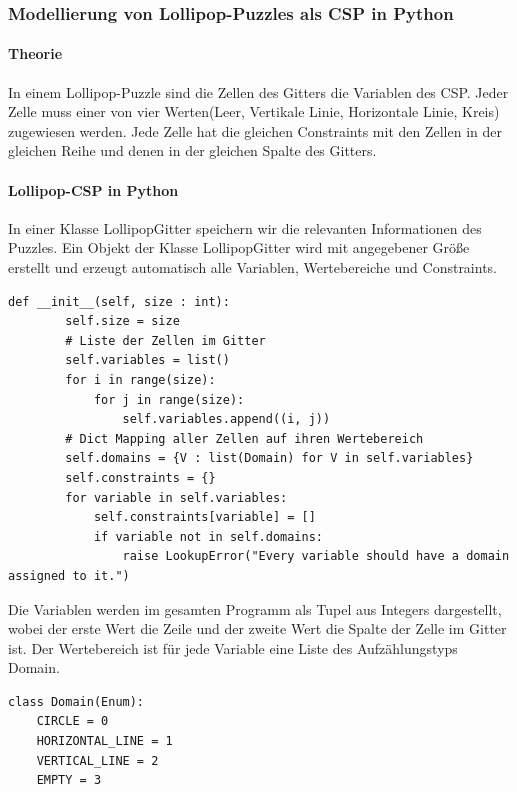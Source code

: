 \documentclass{article}
\begin{document}
\subsubsection{Modellierung von Lollipop-Puzzles als CSP in Python}

\paragraph{Theorie}

In einem Lollipop-Puzzle sind die Zellen des Gitters die Variablen des CSP.
Jeder Zelle muss einer von vier Werten(Leer, Vertikale Linie, Horizontale Linie, Kreis) zugewiesen werden.
Jede Zelle hat die gleichen Constraints mit den Zellen in der gleichen Reihe und denen in der gleichen Spalte des Gitters.

\paragraph{Lollipop-CSP in Python}

In einer Klasse \glqq LollipopGitter\grqq{} speichern wir die relevanten Informationen des Puzzles.
Ein Objekt der Klasse LollipopGitter wird mit angegebener Größe erstellt und erzeugt automatisch alle Variablen, Wertebereiche und Constraints.
\begin{lstlisting}[label={lst:LollipopKonstruktor}]
     def __init__(self, size : int):
        self.size = size
        # Liste der Zellen im Gitter
        self.variables = list()
        for i in range(size):
            for j in range(size):
                self.variables.append((i, j))
        # Dict Mapping aller Zellen auf ihren Wertebereich
        self.domains = {V : list(Domain) for V in self.variables}
        self.constraints = {}
        for variable in self.variables:
            self.constraints[variable] = []
            if variable not in self.domains:
                raise LookupError("Every variable should have a domain assigned to it.")
\end{lstlisting}
Die Variablen werden im gesamten Programm als Tupel aus Integers dargestellt, wobei der erste Wert
die Zeile und der zweite Wert die Spalte der Zelle im Gitter ist.
Der Wertebereich ist für jede Variable eine Liste des Aufzählungstyps Domain.
\begin{lstlisting}[label={lst:domain}]
    class Domain(Enum):
    CIRCLE = 0
    HORIZONTAL_LINE = 1
    VERTICAL_LINE = 2
    EMPTY = 3
\end{lstlisting}
\end{document}

